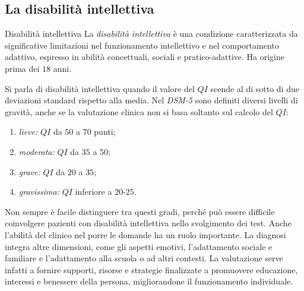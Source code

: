 \documentclass[a4paper]{article}
\begin{document}
\subsection{La disabilità intellettiva}
\begin{snippetdefinition}{Disabilità intellettiva}
    La \emph{disabilità intellettiva} è una condizione caratterizzata da significative limitazioni nel funzionamento intellettivo e nel comportamento adattivo, espresso in abilità concettuali, sociali e pratico-adattive. Ha origine prima dei \(18\) anni.
\end{snippetdefinition}
Si parla di disabilità intellettiva quando il valore del \(QI\) scende al di sotto di due deviazioni standard rispetto alla media.
Nel \emph{DSM-5} sono definiti diversi livelli di gravità, anche se la valutazione clinica non si basa soltanto sul calcolo del \(QI\):
\begin{enumerate}
    \item \emph{lieve:} \(QI\) da \(50\) a \(70\) punti;
    \item \emph{moderata:} \(QI\) da \(35\) a \(50\);
    \item \emph{grave:} \(QI\) da \(20\) a \(35\);
    \item \emph{gravissima:} \(QI\) inferiore a \(20\)-\(25\).
\end{enumerate}
Non sempre è facile distinguere tra questi gradi, perché può essere difficile coinvolgere pazienti con disabilità intellettiva nello svolgimento dei test. Anche l'abilità del clinico nel porre le domande ha un ruolo importante.
La diagnosi integra altre dimensioni, come gli aspetti emotivi, l'adattamento sociale e familiare e l'adattamento alla scuola o ad altri contesti. La valutazione serve infatti a fornire supporti, risorse e strategie finalizzate a promuovere educazione, interessi e benessere della persona, migliorandone il funzionamento individuale.
\end{document}
